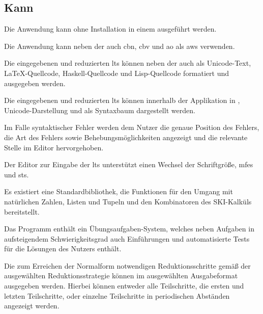 \documentclass[parskip=full,11pt,twoside]{scrartcl}
\begin{document}
\subsection{Kann}
Die Anwendung kann ohne Installation in einem  ausgeführt werden.

Die Anwendung kann neben der  auch \gls{cbn}, \gls{cbv}
und \gls{ao} als \gls{aws} verwenden.

Die eingegebenen und reduzierten \glspl{lt} können neben der 
auch als Unicode-Text, \LaTeX-Quellcode, Haskell-Quellcode und Lisp-Quellcode formatiert und ausgegeben
werden.

Die eingegebenen und reduzierten \glspl{lt} können innerhalb der Applikation in
, Unicode-Darstellung und als Syntaxbaum
dargestellt werden.

Im Falle syntaktischer Fehler werden dem Nutzer die genaue Position des Fehlers, die
Art des Fehlers sowie Behebungsmöglichkeiten angezeigt und die relevante Stelle im
Editor hervorgehoben.

Der Editor zur Eingabe der \glspl{lt} unterstützt einen Wechsel der Schriftgröße,
\glspl{mfe} und \glspl{st}.

Es existiert eine Standardbibliothek, die Funktionen für den Umgang mit natürlichen
Zahlen, Listen und Tupeln und den Kombinatoren des SKI-Kalküls bereitstellt.

Das Programm enthält ein Übungsaufgaben-System, welches neben Aufgaben in aufsteigendem
Schwierigkeitsgrad auch Einführungen und automatisierte Tests für die Lösungen des Nutzers
enthält.

Die zum Erreichen der Normalform notwendigen Reduktionsschritte gemäß der ausgewählten
Reduktionsstrategie können im ausgewählten Ausgabeformat ausgegeben werden. Hierbei
können entweder alle Teilschritte, die ersten und letzten Teilschritte, oder
einzelne Teilschritte in periodischen Abständen angezeigt werden.
\end{document}
